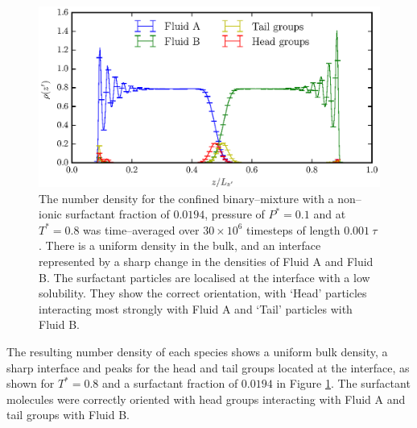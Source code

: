 \begin{figure}[h!]
\centering
\includegraphics[scale=1.0]{SurfRho}
\caption{The number density for the confined binary--mixture with a non--ionic surfactant fraction of $0.0194$, pressure of $P^{*}=0.1$ and at $T^{*}=0.8$ was time--averaged over $30 \times 10^{6}$ timesteps of length $0.001\ \tau$. 
There is a uniform density in the bulk, and an interface represented by a sharp change in the densities of Fluid A and Fluid B.
The surfactant particles are localised at the interface with a low solubility.
They show the correct orientation, with `Head' particles interacting most strongly with Fluid A and `Tail' particles with Fluid B.
}
\label{SurfRho}
\end{figure}

The resulting number density of each species shows a uniform bulk density, a sharp interface and peaks for the head and tail groups located at the interface, as shown for $T^{*}=0.8$ and a surfactant fraction of $0.0194$ in Figure \ref{SurfRho}.
The surfactant molecules were correctly oriented with head groups interacting with Fluid A and tail groups with Fluid B.
\FloatBarrier

